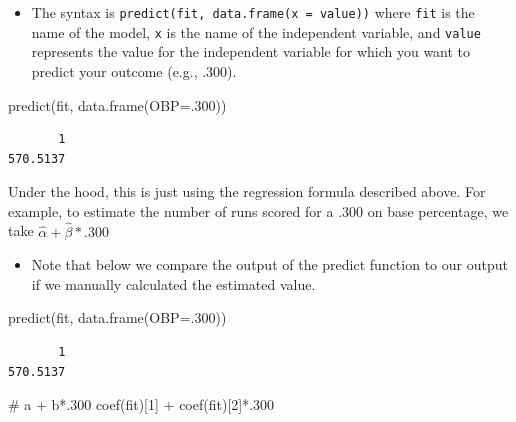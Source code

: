 \documentclass[
  letterpaper,
  DIV=11,
  numbers=noendperiod]{scrreprt}
\newenvironment{Shaded}{\begin{snugshade}}{\end{snugshade}}
\newcommand{\AttributeTok}[1]{\textcolor[rgb]{0.40,0.45,0.13}{#1}}
\newcommand{\CommentTok}[1]{\textcolor[rgb]{0.37,0.37,0.37}{#1}}
\newcommand{\DecValTok}[1]{\textcolor[rgb]{0.68,0.00,0.00}{#1}}
\newcommand{\FunctionTok}[1]{\textcolor[rgb]{0.28,0.35,0.67}{#1}}
\newcommand{\NormalTok}[1]{\textcolor[rgb]{0.00,0.23,0.31}{#1}}
\newcommand{\SpecialCharTok}[1]{\textcolor[rgb]{0.37,0.37,0.37}{#1}}
\providecommand{\tightlist}{%
  \setlength{\itemsep}{0pt}\setlength{\parskip}{0pt}}\usepackage{longtable,booktabs,array}
\begin{document}
\begin{itemize}
\tightlist
\item
  The syntax is \texttt{predict(fit,\ data.frame(x\ =\ value))} where
  \texttt{fit} is the name of the model, \texttt{x} is the name of the
  independent variable, and \texttt{value} represents the value for the
  independent variable for which you want to predict your outcome (e.g.,
  .300).
\end{itemize}

\begin{Shaded}
\begin{Highlighting}[]
\FunctionTok{predict}\NormalTok{(fit, }\FunctionTok{data.frame}\NormalTok{(}\AttributeTok{OBP=}\NormalTok{.}\DecValTok{300}\NormalTok{))}
\end{Highlighting}
\end{Shaded}

\begin{verbatim}
       1 
570.5137 
\end{verbatim}

Under the hood, this is just using the regression formula described
above. For example, to estimate the number of runs scored for a .300 on
base percentage, we take \(\hat \alpha + \hat \beta * .300\)

\begin{itemize}
\tightlist
\item
  Note that below we compare the output of the predict function to our
  output if we manually calculated the estimated value.
\end{itemize}

\begin{Shaded}
\begin{Highlighting}[]
\FunctionTok{predict}\NormalTok{(fit, }\FunctionTok{data.frame}\NormalTok{(}\AttributeTok{OBP=}\NormalTok{.}\DecValTok{300}\NormalTok{))}
\end{Highlighting}
\end{Shaded}

\begin{verbatim}
       1 
570.5137 
\end{verbatim}

\begin{Shaded}
\begin{Highlighting}[]
\CommentTok{\# a + b*.300}
\FunctionTok{coef}\NormalTok{(fit)[}\DecValTok{1}\NormalTok{] }\SpecialCharTok{+}  \FunctionTok{coef}\NormalTok{(fit)[}\DecValTok{2}\NormalTok{]}\SpecialCharTok{*}\NormalTok{.}\DecValTok{300}
\end{Highlighting}
\end{Shaded}
\end{document}

